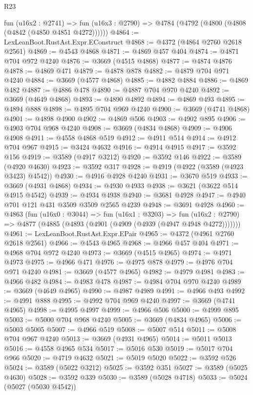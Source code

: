 \begin{lexlean}{R23}
\begin{coremodule}
    fun (u16x2 : @2741) =>
    fun (u16x3 : @2790) => @4784 (@4792 (@4800 (@4808 (@4842 (@4850 @4851 @4272))))))
@4864 := LexLeanBoot.RustAst.Expr.EConstruct
@4868 := @4372 (@4864 @2760 @2618 @2561)
@4869 := @4543 @4868
@4871 := @4869 @457 @404
@4874 := @4871 @704 @972 @4240
@4876 := @3669 (@4515 @4868)
@4877 := @4874 @4876
@4878 := @4869 @471
@4879 := @4878 @878
@4882 := @4879 @704 @971 @4240
@4884 := @3669 (@4577 @4868)
@4885 := @4882 @4884
@4886 := @4869 @482
@4887 := @4886 @478
@4890 := @4887 @704 @970 @4240
@4892 := @3669 (@4649 @4868)
@4893 := @4890 @4892
@4894 := @4869 @493
@4895 := @4894 @888
@4898 := @4895 @704 @969 @4240
@4900 := @3669 (@4741 @4868)
@4901 := @4898 @4900
@4902 := @4869 @506
@4903 := @4902 @895
@4906 := @4903 @704 @968 @4240
@4908 := @3669 (@4834 @4868)
@4909 := @4906 @4908
@4911 := @4558 @4868 @519
@4912 := @4911 @514
@4914 := @4912 @704 @967
@4915 := @3424 @4632
@4916 := @4914 @4915
@4917 := @3592 @156
@4919 := @3589 (@4917 @3212)
@4920 := @3592 @146
@4922 := @3589 (@4920 @4630)
@4923 := @3592 @317
@4928 := @4919 (@4922 (@3589 (@4923 @3423) @4542))
@4930 := @4916 @4928 @4240
@4931 := @3670 @519
@4933 := @3669 (@4931 @4868)
@4934 := @4930 @4933
@4938 := @3621 (@3622 @514 @4915 @4542)
@4939 := @4934 @4938
@4940 := @3681 @4928
@4947 := @4940 @701 @121 @431 @3509 @3509 @2565 @4239
@4948 := @3691 @4928
@4960 := @4863
    (fun (u16x0 : @3044) =>
    fun (u16x1 : @3203) =>
    fun (u16x2 : @2790) => @4877 (@4885 (@4893 (@4901 (@4909 (@4939 (@4947 @4948 @4272)))))))
@4961 := LexLeanBoot.RustAst.Expr.EPair
@4965 := @4372 (@4961 @2760 @2618 @2561)
@4966 := @4543 @4965
@4968 := @4966 @457 @404
@4971 := @4968 @704 @972 @4240
@4973 := @3669 (@4515 @4965)
@4974 := @4971 @4973
@4975 := @4966 @471
@4976 := @4975 @878
@4979 := @4976 @704 @971 @4240
@4981 := @3669 (@4577 @4965)
@4982 := @4979 @4981
@4983 := @4966 @482
@4984 := @4983 @478
@4987 := @4984 @704 @970 @4240
@4989 := @3669 (@4649 @4965)
@4990 := @4987 @4989
@4991 := @4966 @493
@4992 := @4991 @888
@4995 := @4992 @704 @969 @4240
@4997 := @3669 (@4741 @4965)
@4998 := @4995 @4997
@4999 := @4966 @506
@5000 := @4999 @895
@5003 := @5000 @704 @968 @4240
@5005 := @3669 (@4834 @4965)
@5006 := @5003 @5005
@5007 := @4966 @519
@5008 := @5007 @514
@5011 := @5008 @704 @967 @4240
@5013 := @3669 (@4931 @4965)
@5014 := @5011 @5013
@5016 := @4558 @4965 @534
@5017 := @5016 @530
@5019 := @5017 @704 @966
@5020 := @4719 @4632
@5021 := @5019 @5020
@5022 := @3592 @526
@5024 := @3589 (@5022 @3212)
@5025 := @3592 @351
@5027 := @3589 (@5025 @4630)
@5028 := @3592 @339
@5030 := @3589 (@5028 @4718)
@5033 := @5024 (@5027 (@5030 @4542))

\end{coremodule}
\end{lexlean}
